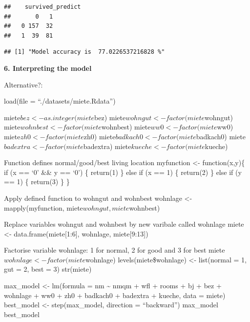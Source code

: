 \documentclass[12,]{article}
\newenvironment{Shaded}{\begin{snugshade}}{\end{snugshade}}
\newcommand{\KeywordTok}[1]{\textcolor[rgb]{0.13,0.29,0.53}{\textbf{{#1}}}}
\newcommand{\DecValTok}[1]{\textcolor[rgb]{0.00,0.00,0.81}{{#1}}}
\newcommand{\StringTok}[1]{\textcolor[rgb]{0.31,0.60,0.02}{{#1}}}
\newcommand{\NormalTok}[1]{{#1}}
\begin{document}
\begin{verbatim}
##    survived_predict
##       0   1
##   0 157  32
##   1  39  81
\end{verbatim}

\begin{Shaded}
\end{Shaded}

\begin{verbatim}
## [1] "Model accuracy is  77.0226537216828 %"
\end{verbatim}

\textbf{6. Interpreting the model}

Alternative?:

load(file = ``./datasets/miete.Rdata'')

miete\(bez <- as.integer(miete\)bez)
miete\(wohngut <- factor(miete\)wohngut)
miete\(wohnbest <- factor(miete\)wohnbest)
miete\(ww0 <- factor(miete\)ww0) miete\(zh0 <- factor(miete\)zh0)
miete\(badkach0 <- factor(miete\)badkach0)
miete\(badextra <- factor(miete\)badextra)
miete\(kueche <- factor(miete\)kueche)

Function defines normal/good/best living location myfunction
\textless{}- function(x,y)\{ if (x == `0' \&\& y == `0') \{ return(1) \}
else if (x == 1) \{ return(2) \} else if (y == 1) \{ return(3) \} \}

Apply defined function to wohngut and wohnbest wohnlage \textless{}-
mapply(myfunction, miete\(wohngut, miete\)wohnbest)

Replace variables wohngut and wohnbest by new varibale called wohnlage
miete \textless{}- data.frame(miete{[}1:6{]}, wohnlage, miete{[}9:13{]})

Factorise variable wohnlage: 1 for normal, 2 for good and 3 for best
miete\(wohnlage <- factor(miete\)wohnlage) levels(miete\$wohnlage)
\textless{}- list(normal = 1, gut = 2, best = 3) str(miete)

max\_model \textless{}- lm(formula = nm \textasciitilde{} nmqm + wfl +
rooms + bj + bez + wohnlage + ww0 + zh0 + badkach0 + badextra + kueche,
data = miete) best\_model \textless{}- step(max\_model, direction =
``backward'') max\_model best\_model
\end{document}
